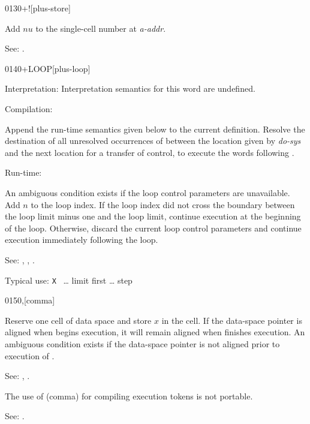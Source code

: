 \begin{newword}{0130}{+!}[plus-store]

	Add $n$\textbar$u$ to the single-cell number at \emph{a-addr}.

\item[See:]
	.
\end{newword}


\begin{newword*}{0140}{+LOOP}[plus-loop]
\item[Interpretation:]
	Interpretation semantics for this word are undefined.

\item[Compilation:]

	Append the run-time semantics given below to the current
	definition. Resolve the destination of all unresolved
	occurrences of  between the location given
	by \emph{do-sys} and the next location for a transfer of
	control, to execute the words following .

\item[Run-time:]

	An ambiguous condition exists if the loop control parameters
	are unavailable. Add $n$ to the loop index. If the loop index
	did not cross the boundary between the loop limit minus one and
	the loop limit, continue execution at the beginning of the loop.
	Otherwise, discard the current loop control parameters and
	continue execution immediately following the loop.

\item[See:]
	,
	,
	.

	\begin{rationale} %
		Typical use:
			\word{:} \texttt{X} ~{\ldots} limit first 
				{\ldots} step 
			\word{;}
	\end{rationale}
\end{newword*}


\begin{newword}{0150}{,}[comma]

	Reserve one cell of data space and store $x$ in the cell. If the
	data-space pointer is aligned when \word{,} begins execution, it
	will remain aligned when \word{,} finishes execution.
	An ambiguous condition exists if the data-space pointer is not
	aligned prior to execution of \word{,}.

\item[See:]
	,
	.

	\begin{rationale} %
		The use of \word{,} (comma) for compiling execution tokens is
		not portable.

		See: .
	\end{rationale}
\end{newword}


